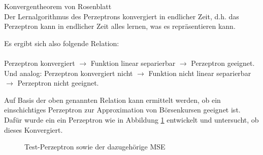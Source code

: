 \begin{theo}Konvergentheorem von Rosenblatt\\
Der Lernalgorithmus des Perzeptrons konvergiert in endlicher Zeit, d.h. das Perzeptron kann in endlicher Zeit alles lernen, was es repräsentieren kann.
\end{theo}

Es ergibt sich also folgende Relation:\\\\
Perzeptron konvergiert $\rightarrow$ Funktion linear separierbar $\rightarrow$ Perzeptron geeignet.
Und analog: Perzeptron konvergiert nicht $\rightarrow$ Funktion nicht linear separierbar $\rightarrow$ Perzeptron nicht geeignet.

Auf Basis der oben genannten Relation kann ermittelt werden, ob ein einschichtiges Perzeptron zur Approximation von Börsenkursen geeignet ist. Dafür wurde ein ein Perzeptron wie in Abbildung \ref{Testperz} entwickelt und untersucht, ob dieses Konvergiert.

\begin{figure}[H]
\hfill
{}
\hfill
{}
\hfill
\caption{Test-Perzeptron sowie der dazugehörige MSE}
\label{Testperz}
\end{figure}

